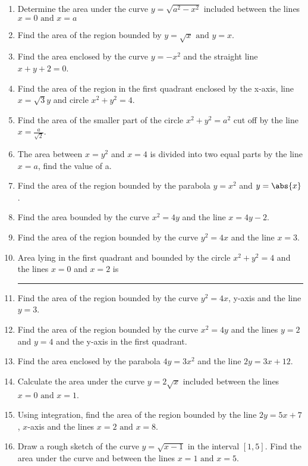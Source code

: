 \begin{enumerate}[label=\thesubsection.\arabic*,ref=\thesubsection.\theenumi]
\item Determine the area under the curve $y = \sqrt{a^2 - x^2}$ included between the lines $x = 0\text{ and }x = a$
\item Find the area of the region bounded by $y = \sqrt{x}\text{ and }y = x$.
\item Find the area enclosed by the curve $y = - x^2$ and the straight line $x + y + 2 = 0$.
\item 
		  Find the area of the region in the first quadrant enclosed by the x-axis, line $x=\sqrt{3}y$ and circle $x^2+y^2=4$.
		  \\
		  \solution
\label{chapters/12/8/1/6}

\item 
	Find the area of the smaller part of the circle $x^2+y^2=a^2 $ cut off by the line $x=\frac{a}{\sqrt{2}}$.
\item 
The area between $x = y^2$ and $x = 4$ is divided into two equal parts by the line $x = a$, find the value of a.
\item 
	Find the area of the region bounded by the parabola $y=x^2$ and $y= \abs{x}$.
\label{chapters/12/8/1/9}
\item 
Find the area bounded by the curve $x^2=4y$ and the line $x=4y-2$.
\item Find the area of the region bounded by the curve ${y}^2
= 4{x}$ and the line ${x} = 3$.
\label{chapters/12/8/1/11}
\item Area lying in the first quadrant and bounded by the circle ${x}^2 + {y}^2 = 4$ and the lines ${x} = 0$ and ${x} = 2$ is \rule{1cm}{0.1pt}
\label{chapters/12/8/1/12}
\item Find the area of the region bounded by the curve $y^2 = 4x$, y-axis and the line $y = 3$. 
\label{chapters/12/8/1/13}
\item 
Find the area of the region bounded by the curve $x^2=4y$ and the lines $y=2$ and $y=4$ and the y-axis in the first quadrant.
\item 
	Find the area enclosed by the parabola $4y=3x^2 $ and the line $2y=3x+12$.
\item Calculate the area under the curve $y = 2\sqrt{x}$ included between the lines $x = 0\text{ and }x = 1$.
\item Using integration, find the area of the region bounded by the line $2y = 5x + 7$, $x$-axis and the lines $x = 2\text{ and }x =8$.
\item Draw a rough sketch of the curve $y = \sqrt{x - 1}$ in the interval $[1, 5]$. Find the area under the curve and between the lines $x = 1\text{ and }x = 5$.

\end{enumerate}
